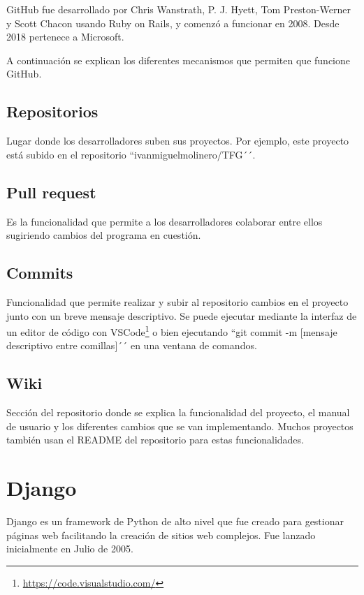 \documentclass[a4paper, 12pt]{book}
\begin{document}
GitHub fue desarrollado por Chris Wanstrath, P. J. Hyett, Tom Preston-Werner y Scott Chacon usando Ruby on Rails, y comenzó a funcionar en 2008. Desde 2018 pertenece a Microsoft.

A continuación se explican los diferentes mecanismos que permiten que funcione GitHub.

\subsection{Repositorios}

Lugar donde los desarrolladores suben sus proyectos. Por ejemplo, este proyecto está subido en el repositorio ``ivanmiguelmolinero/TFG´´.

\subsection{Pull request}

Es la funcionalidad que permite a los desarrolladores colaborar entre ellos sugiriendo cambios del programa en cuestión.

\subsection{Commits}

Funcionalidad que permite realizar y subir al repositorio cambios en el proyecto junto con un breve mensaje descriptivo. Se puede ejecutar mediante la interfaz de un editor de código con VSCode\footnote{\url{https://code.visualstudio.com/}} o bien ejecutando ``git commit -m [mensaje descriptivo entre comillas]´´ en una ventana de comandos.

\subsection{Wiki}

Sección del repositorio donde se explica la funcionalidad del proyecto, el manual de usuario y los diferentes cambios que se van implementando. Muchos proyectos también usan el README del repositorio para estas funcionalidades.

\section{Django}
\label{sec:django}

Django es un framework de Python de alto nivel que fue creado para gestionar páginas web facilitando la creación de sitios web complejos. Fue lanzado inicialmente en Julio de 2005. 
\end{document}
